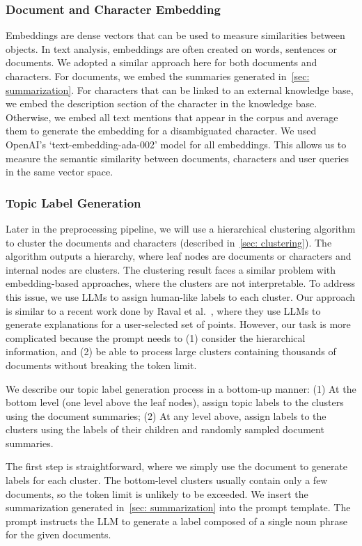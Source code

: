\subsubsection{Document and Character Embedding}\label{sec: embeddings} 
Embeddings are dense vectors that can be used to measure similarities between objects.
In text analysis, embeddings are often created on words, sentences or documents.
We adopted a similar approach here for both documents and characters.
For documents, we embed the summaries generated in~\autoref{sec: summarization}.
For characters that can be linked to an external knowledge base,
we embed the description section of the character in the knowledge base.
Otherwise, we embed all text mentions that appear in the corpus and average them to generate the embedding for a disambiguated character.
We used OpenAI's `text-embedding-ada-002' model for all embeddings. 
This allows us to measure the semantic similarity between documents, characters and user queries in the same vector space.

\subsubsection{Topic Label Generation}\label{sec: tag_assignment}
Later in the preprocessing pipeline, we will use a hierarchical clustering algorithm to cluster the documents and characters (described in~\autoref{sec: clustering}). 
The algorithm outputs a hierarchy, where leaf nodes are documents or characters and internal nodes are clusters.
The clustering result faces a similar problem with embedding-based approaches, where the clusters are not interpretable.
To address this issue, we use LLMs to assign human-like labels to each cluster.
Our approach is similar to a recent work done by Raval et al.~\cite{raval2023explainandtrust}, where they use LLMs to generate explanations for a user-selected set of points.
However, our task is more complicated because the prompt needs to (1) consider the hierarchical information, and (2) be able to process large clusters containing thousands of documents without breaking the token limit.

We describe our topic label generation process in a bottom-up manner:
(1) At the bottom level (one level above the leaf nodes), assign topic labels to the clusters using the document summaries;
(2) At any level above, assign labels to the clusters using the labels of their children and randomly sampled document summaries.

The first step is straightforward, where we simply use the document to generate labels for each cluster.
The bottom-level clusters usually contain only a few documents, so the token limit is unlikely to be exceeded.
We insert the summarization generated in~\autoref{sec: summarization} into the prompt template.
The prompt instructs the LLM to generate a label composed of a single noun phrase for the given documents.

